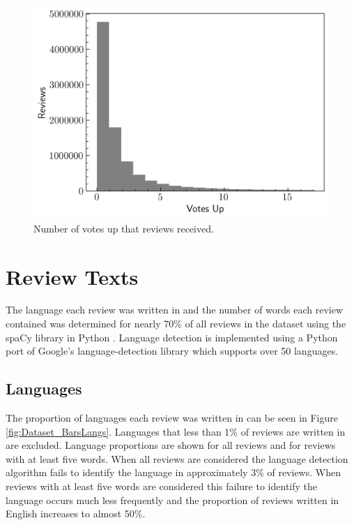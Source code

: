 \begin{figure}[ht]
    \centering
    \includegraphics[scale=0.55]{figures/03_dataset/11_hist_review_votes.png}
    \caption{Number of votes up that reviews received.}
    \label{fig:Dataset_HistVotes}
\end{figure}

\section{Review Texts} \label{sec:Dataset_ReviewTexts}

The language each review was written in and the number of words each review contained was determined for nearly 70\% of all reviews in the dataset using the spaCy library in Python \cite{spacy}. Language detection is implemented using a Python port \cite{PyPi_LangDetect} of Google's language-detection library \cite{Nakatani2010_LangDetect} which supports over 50 languages.

\subsection{Languages} \label{sec:Dataset_RT_Langs}

The proportion of languages each review was written in can be seen in Figure \ref{fig:Dataset_BarsLangs}. Languages that less than 1\% of reviews are written in are excluded. Language proportions are shown for all reviews and for reviews with at least five words. When all reviews are considered the language detection algorithm fails to identify the language in approximately 3\% of reviews. When reviews with at least five words are considered this failure to identify the language occurs much less frequently and the proportion of reviews written in English increases to almost 50\%.

